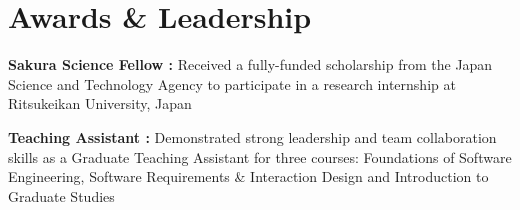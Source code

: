 \documentclass[letterpaper]{article}
\makeatletter
\newcommand{\resumeItemWithoutTitle}[1]{
  \item\small{
    {#1 \vspace{-2pt}}
  }
}
\newcommand{\shortSection}[1]{
    \vspace{-6pt}
    \section{#1}
}
\newcommand{\projectHeading}[3]{
  \begin{tabular*}{\textwidth}{l@{\extracolsep{\fill}}r}
        \textbf{#1} 
        \hspace{-2pt} $\vert$ \hspace{-2pt} \small{\textit{#2}} 
        & 
        \textit{#3} \\
    \end{tabular*}\vspace{-2pt}
}
\newcommand*{\skill}[2]{
  \textbf{#1 : }#2 \\
  \vspace{1pt}
}
\newcommand{\resumeItemListStart}{\begin{itemize}}
\newcommand{\resumeItemListEnd}{\end{itemize}}
\makeatother
\begin{document}

\shortSection{Awards \& Leadership}
\skill{Sakura Science Fellow}{Received a fully-funded scholarship from the Japan Science and Technology Agency to participate in a research internship at Ritsukeikan University, Japan}
\skill{Teaching Assistant}{Demonstrated strong leadership and team collaboration skills as a Graduate Teaching Assistant for three courses: Foundations of Software Engineering, Software Requirements \& Interaction Design and Introduction to Graduate Studies}
\end{document}
